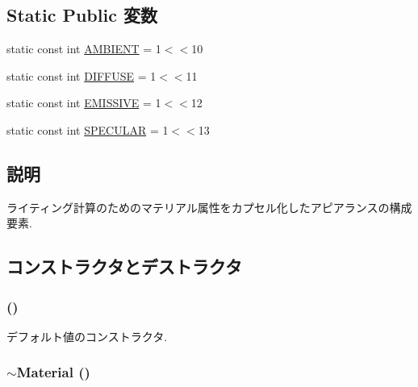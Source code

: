\subsection*{Static Public 変数}
\begin{CompactItemize}
\item 
static const int \hyperlink{classm3g_1_1Material_4cf648a82d9de62a1fb15f4277049594}{AMBIENT} = 1$<$$<$10
\item 
static const int \hyperlink{classm3g_1_1Material_9798073e44254569f47464dc6bf5da89}{DIFFUSE} = 1$<$$<$11
\item 
static const int \hyperlink{classm3g_1_1Material_b92d57adf6955eae6adac15e865659cd}{EMISSIVE} = 1$<$$<$12
\item 
static const int \hyperlink{classm3g_1_1Material_cac20b25665d9a3713bec3a772a89ede}{SPECULAR} = 1$<$$<$13
\end{CompactItemize}


\subsection{説明}
ライティング計算のためのマテリアル属性をカプセル化したアピアランスの構成要素. 

\subsection{コンストラクタとデストラクタ}
\hypertarget{classm3g_1_1Material_ade2019060d01e7983e9bc40ea6aa404}{
\subsubsection[{Material}]{ ()}}
\label{classm3g_1_1Material_ade2019060d01e7983e9bc40ea6aa404}


デフォルト値のコンストラクタ. \hypertarget{classm3g_1_1Material_b15b7efa255e5cca9b02a031a783cfe8}{
\subsubsection[{$\sim$Material}]{\setlength{\rightskip}{0pt plus 5cm}$\sim${\bf Material} ()}}
\label{classm3g_1_1Material_b15b7efa255e5cca9b02a031a783cfe8}



